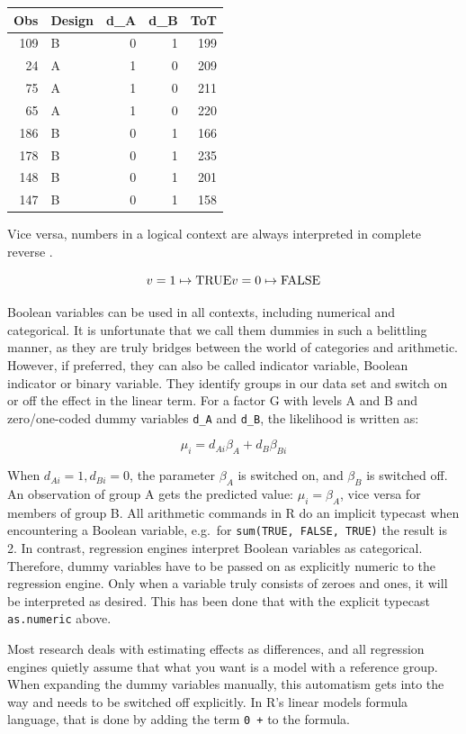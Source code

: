 \documentclass[]{svmono}
\begin{document}
\begin{tabular}{r|l|r|r|r}
\hline
Obs & Design & d\_A & d\_B & ToT\\
\hline
109 & B & 0 & 1 & 199\\
\hline
24 & A & 1 & 0 & 209\\
\hline
75 & A & 1 & 0 & 211\\
\hline
65 & A & 1 & 0 & 220\\
\hline
186 & B & 0 & 1 & 166\\
\hline
178 & B & 0 & 1 & 235\\
\hline
148 & B & 0 & 1 & 201\\
\hline
147 & B & 0 & 1 & 158\\
\hline
\end{tabular}

Vice versa, numbers in a logical context are always interpreted in
complete reverse .

\[ 
v = 1 \mapsto \mathrm{TRUE}\\ v = 0 \mapsto \mathrm{FALSE} 
\]

Boolean variables can be used in all contexts, including numerical and
categorical. It is unfortunate that we call them dummies in such a
belittling manner, as they are truly bridges between the world of
categories and arithmetic. However, if preferred, they can also be
called indicator variable, Boolean indicator or binary variable. They
identify groups in our data set and switch on or off the effect in the
linear term. For a factor G with levels A and B and zero/one-coded dummy
variables \texttt{d\_A} and \texttt{d\_B}, the likelihood is written as:

\[ 
\mu_i = d_{Ai} \beta_{A} + d_B \beta_{Bi} 
\]

When \(d_{Ai}=1, d_{Bi}=0\), the parameter \(\beta_A\) is switched on,
and \(\beta_B\) is switched off. An observation of group A gets the
predicted value: \(\mu_i = \beta_A\), vice versa for members of group B.
All arithmetic commands in R do an implicit typecast when encountering a
Boolean variable, e.g.~for \texttt{sum(TRUE,\ FALSE,\ TRUE)} the result
is 2. In contrast, regression engines interpret Boolean variables as
categorical. Therefore, dummy variables have to be passed on as
explicitly numeric to the regression engine. Only when a variable truly
consists of zeroes and ones, it will be interpreted as desired. This has
been done that with the explicit typecast \texttt{as.numeric} above.

Most research deals with estimating effects as differences, and all
regression engines quietly assume that what you want is a model with a
reference group. When expanding the dummy variables manually, this
automatism gets into the way and needs to be switched off explicitly. In
R's linear models formula language, that is done by adding the term
\texttt{0\ +} to the formula.
\end{document}
